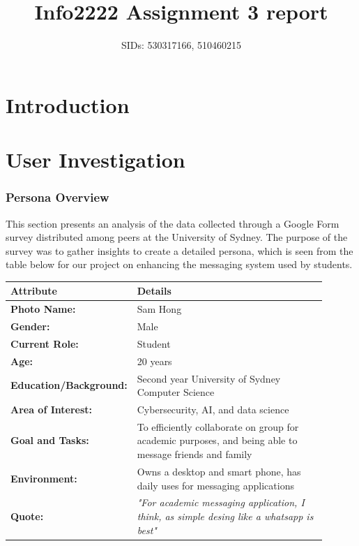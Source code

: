 \documentclass[12pt,a4paper]{article}
\title{Info2222 Assignment 3 report}
\author{SIDs: 530317166, 510460215}
\date{}
\begin{document}
\maketitle

\section{Introduction}

\section{User Investigation}
\subsubsection*{Persona Overview}
This section presents an analysis of the data collected through a Google Form survey distributed among peers at the University of Sydney. The purpose of the survey was to gather insights to create a detailed persona, which is seen from the table below for our project on enhancing the messaging system used by students.

\noindent
\begin{tabular}{|p{0.3\linewidth}|p{0.6\linewidth}|}
\hline
\textbf{Attribute} & \textbf{Details} \\
\hline
\textbf{Photo Name:} & Sam Hong \\
\hline
\textbf{Gender:} & Male \\
\hline
\textbf{Current Role:} & Student \\
\hline
\textbf{Age:} & 20 years \\
\hline
\textbf{Education/Background:} & Second year University of Sydney Computer Science \\
\hline
\textbf{Area of Interest:} & Cybersecurity, AI, and data science \\
\hline
\textbf{Goal and Tasks:} & To efficiently collaborate on group for academic purposes, and being able to message friends and family \\
\hline
\textbf{Environment:} & Owns a desktop and smart phone, has daily uses for messaging applications \\
\hline
\textbf{Quote:} & \textit{"For academic messaging application, I think, as simple desing like a whatsapp is best"} \\
\hline
\end{tabular}
\end{document}
